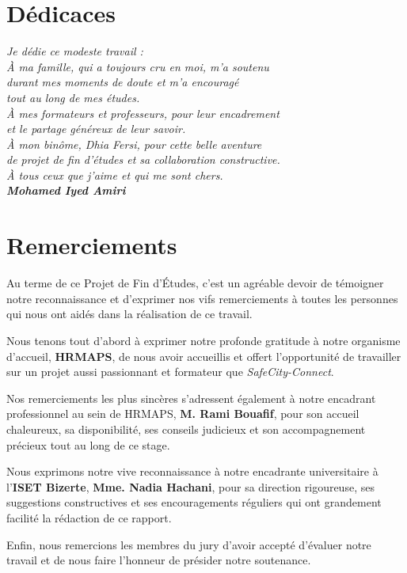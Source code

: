 \chapter*{Dédicaces}

\begin{flushright}
    \itshape
    Je dédie ce modeste travail : \\
    
    À ma famille, qui a toujours cru en moi, m'a soutenu \\
    durant mes moments de doute et m'a encouragé \\
    tout au long de mes études. \\
    
    À mes formateurs et professeurs, pour leur encadrement \\
    et le partage généreux de leur savoir. \\
    
    À mon binôme, Dhia Fersi, pour cette belle aventure \\
    de projet de fin d'études et sa collaboration constructive. \\
    
    À tous ceux que j'aime et qui me sont chers. \\
    
    \vspace{1.5cm}
    \textbf{Mohamed Iyed Amiri}
\end{flushright}

\newpage

\thispagestyle{plain}
\chapter*{Remerciements}

\noindent
Au terme de ce Projet de Fin d'Études, c'est un agréable devoir de témoigner notre reconnaissance et d'exprimer nos vifs remerciements à toutes les personnes qui nous ont aidés dans la réalisation de ce travail.

Nous tenons tout d'abord à exprimer notre profonde gratitude à notre organisme d'accueil, \textbf{HRMAPS}, de nous avoir accueillis et offert l'opportunité de travailler sur un projet aussi passionnant et formateur que \textit{SafeCity-Connect}.

Nos remerciements les plus sincères s'adressent également à notre encadrant professionnel au sein de HRMAPS, \textbf{M. Rami Bouafif}, pour son accueil chaleureux, sa disponibilité, ses conseils judicieux et son accompagnement précieux tout au long de ce stage.

Nous exprimons notre vive reconnaissance à notre encadrante universitaire à l'\textbf{ISET Bizerte}, \textbf{Mme. Nadia Hachani}, pour sa direction rigoureuse, ses suggestions constructives et ses encouragements réguliers qui ont grandement facilité la rédaction de ce rapport.

Enfin, nous remercions les membres du jury d'avoir accepté d'évaluer notre travail et de nous faire l'honneur de présider notre soutenance.
